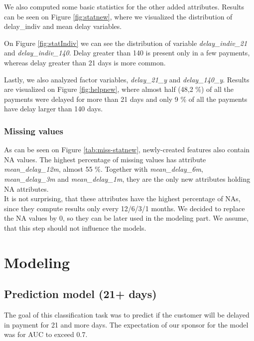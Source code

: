 \documentclass[
]{article}
\begin{document}
We also computed some basic statistics for the other added attributes.
Results can be seen on Figure \ref{fig:statnew}, where we visualized the distribution of delay\_indiv and mean delay variables.

On Figure \ref{fig:statIndiv} we can see the distribution of variable \emph{delay\_indiv\_21} and \emph{delay\_indiv\_140}. Delay greater than 140 is present only in a few payments, whereas delay greater than 21 days is more common.

Lastly, we also analyzed factor variables, \emph{delay\_21\_y} and \emph{delay\_140\_y}. Results are visualized on Figure \ref{fig:helpnew}, where almost half (48,2 \%) of all the payments were delayed for more than 21 days and only 9 \% of all the payments have delay larger than 140 days.

\hypertarget{missing-values-1}{%
\subsubsection{Missing values}\label{missing-values-1}}

As can be seen on Figure \ref{tab:miss-statnew}, newly-created features also contain NA values. The highest percentage of missing values has attribute \emph{mean\_delay\_12m}, almost 55 \%. Together with \emph{mean\_delay\_6m}, \emph{mean\_delay\_3m} and \emph{mean\_delay\_1m}, they are the only new attributes holding NA attributes.\\
It is not surprising, that these attributes have the highest percentage of NAs, since they compute results only every 12/6/3/1 months. We decided to replace the NA values by 0, so they can be later used in the modeling part. We assume, that this step should not influence the models.

\hypertarget{modeling}{%
\section{Modeling}\label{modeling}}

\hypertarget{prediction-model-21-days}{%
\subsection{Prediction model (21+ days)}\label{prediction-model-21-days}}

The goal of this classification task was to predict if the customer will be delayed in payment for 21 and more days. The expectation of our sponsor for the model was for AUC to exceed 0.7.
\end{document}
